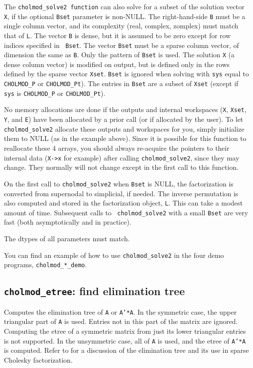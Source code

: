 \documentclass[11pt]{article}
\begin{document}
The {\tt cholmod\_solve2 function} can also solve for a subset of the solution
vector {\tt X}, if the optional {\tt Bset} parameter is non-NULL.  The
right-hand-side {\tt B} must be a single column vector, and its complexity
(real, complex, zomplex) must match that of {\tt L}.  The vector {\tt B} is
dense, but it is assumed to be zero except for row indices specified in {\tt
Bset}.  The vector {\tt Bset} must be a sparse column vector, of dimension the
same as {\tt B}.  Only the pattern of {\tt Bset} is used.  The solution {\tt X}
(a dense column vector) is modified on output, but is defined only in the rows
defined by the sparse vector {\tt Xset}.  {\tt Bset} is ignored when solving
with {\tt sys} equal to {\tt CHOLMOD\_P} or {\tt CHOLMOD\_Pt}).  The entries in
{\tt Bset} are a subset of {\tt Xset} (except if {\tt sys} is {\tt CHOLMOD\_P}
or {\tt CHOLMOD\_Pt}).

No memory allocations are done if the outputs and internal workspaces ({\tt X},
{\tt Xset}, {\tt Y}, and {\tt E}) have been allocated by a prior call (or if
allocated by the user).  To let {\tt cholmod\_solve2} allocate these outputs
and workspaces for you, simply initialize them to NULL (as in the example
above).  Since it is possible for this function to reallocate these 4 arrays,
you should always re-acquire the pointers to their internal data ({\tt X->x}
for example) after calling {\tt cholmod\_solve2}, since they may change.  They
normally will not change except in the first call to this function.

On the first call to {\tt cholmod\_solve2} when {\tt Bset} is NULL, the
factorization is converted from supernodal to simplicial, if needed.  The
inverse permutation is also computed and stored in the factorization object,
{\tt L}.  This can take a modest amount of time.  Subsequent calls to {\tt
cholmod\_solve2} with a small {\tt Bset} are very fast (both asymptotically and
in practice).

The dtypes of all parameters must match.

You can find an example of how to use {\tt cholmod\_solve2} in the
four demo programs, {\tt cholmod\_*\_demo}.

\subsection{{\tt cholmod\_etree}: find elimination tree}


Computes the elimination tree of {\tt A} or {\tt A'*A}.  In the symmetric case,
the upper triangular part of {\tt A} is used.  Entries not in this part of the
matrix are ignored.  Computing the etree of a symmetric matrix from just its
lower triangular entries is not supported.  In the unsymmetric case, all of
{\tt A} is used, and the etree of {\tt A'*A} is computed.  Refer to
\cite{Liu90a} for a discussion of the elimination tree and its use in sparse
Cholesky factorization.
\end{document}
